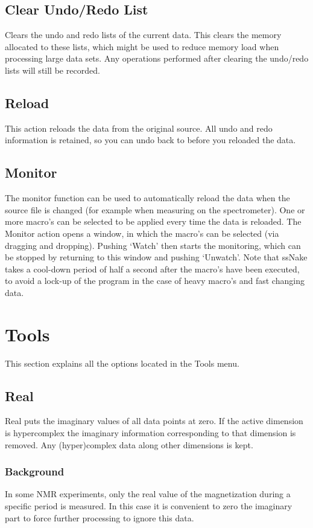 \documentclass[11pt,a4paper]{article}
\begin{document}
\subsection{Clear Undo/Redo List}
Clears the undo and redo lists of the current data. This clears the memory allocated to these lists, which might be used to reduce memory load when processing large data sets.
Any operations performed after clearing the undo/redo lists will still be recorded.

\subsection{Reload}
This action reloads the data from the original source. All undo and redo information is retained, so you can undo back to before you reloaded the data. 

\subsection{Monitor}
The monitor function can be used to automatically reload the data when the source file is changed (for example when measuring on the spectrometer). One or more macro's can be selected to be applied every time the data is reloaded. The Monitor action opens a window, in which the macro's can be selected (via dragging and dropping). Pushing `Watch' then starts the monitoring, which can be stopped by returning to this window and pushing `Unwatch'. Note that ssNake takes a cool-down period of half a second after the macro's have been executed, to avoid a lock-up of the program in the case of heavy macro's and fast changing data.


\section{Tools}
This section explains all the options located in the Tools menu.

\subsection{Real}
Real puts the imaginary values of all data points at zero. If the active dimension is hypercomplex the imaginary information corresponding to that dimension is removed. Any (hyper)complex data along other dimensions is kept.

\subsubsection*{Background}
In some NMR experiments, only the real value of the magnetization during a specific period is measured. In this case it is convenient to zero the imaginary part to force further processing to ignore this data.
\end{document}
